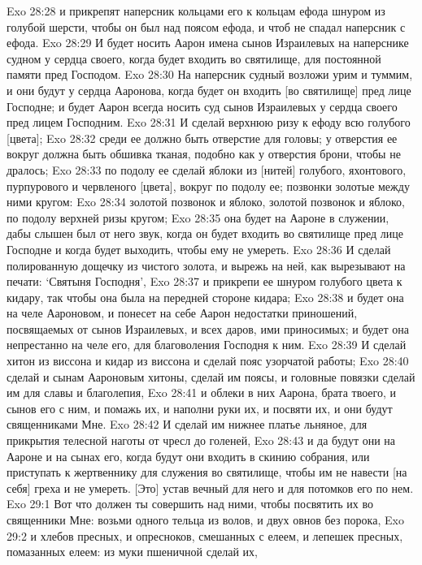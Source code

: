 Exo 28:28  и прикрепят наперсник кольцами его к кольцам ефода шнуром из голубой шерсти, чтобы он был над поясом ефода, и чтоб не спадал наперсник с ефода.
Exo 28:29  И будет носить Аарон имена сынов Израилевых на наперснике судном у сердца своего, когда будет входить во святилище, для постоянной памяти пред Господом.
Exo 28:30  На наперсник судный возложи урим и туммим, и они будут у сердца Ааронова, когда будет он входить [во святилище] пред лице Господне; и будет Аарон всегда носить суд сынов Израилевых у сердца своего пред лицем Господним.
Exo 28:31  И сделай верхнюю ризу к ефоду всю голубого [цвета];
Exo 28:32  среди ее должно быть отверстие для головы; у отверстия ее вокруг должна быть обшивка тканая, подобно как у отверстия брони, чтобы не дралось;
Exo 28:33  по подолу ее сделай яблоки из [нитей] голубого, яхонтового, пурпурового и червленого [цвета], вокруг по подолу ее; позвонки золотые между ними кругом:
Exo 28:34  золотой позвонок и яблоко, золотой позвонок и яблоко, по подолу верхней ризы кругом;
Exo 28:35  она будет на Аароне в служении, дабы слышен был от него звук, когда он будет входить во святилище пред лице Господне и когда будет выходить, чтобы ему не умереть.
Exo 28:36  И сделай полированную дощечку из чистого золота, и вырежь на ней, как вырезывают на печати: `Святыня Господня',
Exo 28:37  и прикрепи ее шнуром голубого цвета к кидару, так чтобы она была на передней стороне кидара;
Exo 28:38  и будет она на челе Аароновом, и понесет на себе Аарон недостатки приношений, посвящаемых от сынов Израилевых, и всех даров, ими приносимых; и будет она непрестанно на челе его, для благоволения Господня к ним.
Exo 28:39  И сделай хитон из виссона и кидар из виссона и сделай пояс узорчатой работы;
Exo 28:40  сделай и сынам Аароновым хитоны, сделай им поясы, и головные повязки сделай им для славы и благолепия,
Exo 28:41  и облеки в них Аарона, брата твоего, и сынов его с ним, и помажь их, и наполни руки их, и посвяти их, и они будут священниками Мне.
Exo 28:42  И сделай им нижнее платье льняное, для прикрытия телесной наготы от чресл до голеней,
Exo 28:43  и да будут они на Аароне и на сынах его, когда будут они входить в скинию собрания, или приступать к жертвеннику для служения во святилище, чтобы им не навести [на себя] греха и не умереть. [Это] устав вечный для него и для потомков его по нем.
Exo 29:1  Вот что должен ты совершить над ними, чтобы посвятить их во священники Мне: возьми одного тельца из волов, и двух овнов без порока,
Exo 29:2  и хлебов пресных, и опресноков, смешанных с елеем, и лепешек пресных, помазанных елеем: из муки пшеничной сделай их,
